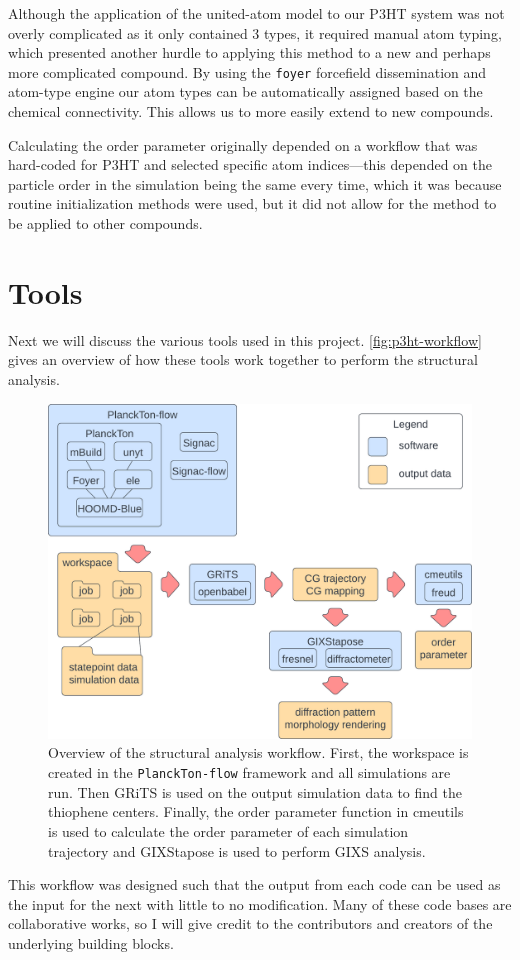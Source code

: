 Although the application of the united-atom model to our P3HT system was not overly complicated as it only contained 3 types, it required manual atom typing, which presented another hurdle to applying this method to a new and perhaps more complicated compound. 
By using the \texttt{foyer} forcefield dissemination and atom-type engine \cite{foyer} our atom types can be automatically assigned based on the chemical connectivity. This allows us to more easily extend to new compounds.

Calculating the order parameter originally depended on a workflow that was hard-coded for P3HT and selected specific atom indices---this depended on the particle order in the simulation being the same every time, which it was because routine initialization methods were used, but it did not allow for the method to be applied to other compounds.

\section{Tools}

Next we will discuss the various tools used in this project.  \autoref{fig:p3ht-workflow} gives an overview of how these tools work together to perform the structural analysis.
\begin{figure}[h!]
    \centering
    \includegraphics[width=0.8\linewidth]{figures/p3ht_val/workflow.png}
    \caption{Overview of the structural analysis workflow. First, the workspace is created in the \texttt{PlanckTon-flow} framework and all simulations are run. Then GRiTS is used on the output simulation data to find the thiophene centers. Finally, the order parameter function in cmeutils is used to calculate the order parameter of each simulation trajectory and GIXStapose is used to perform GIXS analysis.}\label{fig:p3ht-workflow}
\end{figure}
This workflow was designed such that the output from each code can be used as the input for the next with little to no modification. 
Many of these code bases are collaborative works, so I will give credit to the contributors and creators of the underlying building blocks.

